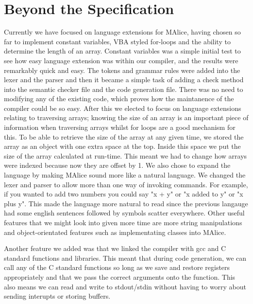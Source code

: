 \documentclass[8pt, a4paper]{article}
\begin{document}
\section{Beyond the Specification}

Currently we have focused on language extensions for MAlice, having chosen so far to implement constant variables, VBA styled for-loops and the ability to determine the length of an array. Constant variables was a simple initial test to see how easy language extension was within our compiler, and the results were remarkably quick and easy. The tokens and grammar rules were added into the lexer and the parser and then it became a simple task of adding a check method into the semantic checker file and the code generation file. There was no need to modifying any of the existing code, which proves how the maintanence of the compiler could be so easy. After this we elected to focus on language extensions relating to traversing arrays; knowing the size of an array is an important piece of information when traversing arrays whilst for loops are a good mechanism for this. To be able to retrieve the size of the array at any given time, we stored the array as an object with one extra space at the top. Inside this space we put the size of the array calculated at run-time. This meant we had to change how arrays were indexed because now they are offset by 1. We also chose to expand the language by making MAlice sound more like a natural language. We changed the lexer and parser to allow more than one way of invoking commands. For example, if you wanted to add two numbers you could say "x + y" or "x added to y" or "x plus y". This made the language more natural to read since the previous langauge had some english sentences followed by symbols scatter everywhere. Other useful features that we might look into given more time are more string manipulations and object-orientated features such as implementating classes into MAlice. 

Another feature we added was that we linked the compiler with gcc and C standard functions and libraries. This meant that during code generation, we can call any of the C standard functions so long as we save and restore registers appropriately and that we pass the correct arguments onto the function. This also means we can read and write to stdout/stdin without having to worry about sending interupts or storing buffers.  
\end{document}
